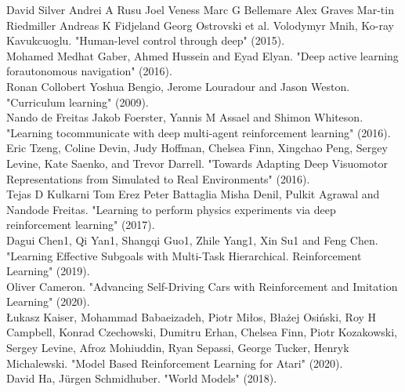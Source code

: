 \begin{thebibliography}{69}
 David Silver Andrei A Rusu Joel Veness Marc G Bellemare Alex Graves Mar-tin Riedmiller Andreas K Fidjeland Georg Ostrovski et al. Volodymyr Mnih, Ko-ray Kavukcuoglu. "Human-level control through deep" (2015).\\

 Mohamed Medhat Gaber, Ahmed Hussein and Eyad Elyan. "Deep active learning forautonomous navigation" (2016).\\

 Ronan Collobert Yoshua Bengio, Jerome Louradour and Jason Weston. "Curriculum learning" (2009).\\

 Nando de Freitas Jakob Foerster, Yannis M Assael and Shimon Whiteson. "Learning tocommunicate with deep multi-agent reinforcement learning" (2016).\\

 Eric Tzeng, Coline Devin, Judy Hoffman, Chelsea Finn, Xingchao Peng, Sergey Levine, Kate Saenko, and Trevor Darrell. "Towards Adapting Deep Visuomotor Representations from Simulated to Real Environments" (2016).\\

 Tejas D Kulkarni Tom Erez Peter Battaglia Misha Denil, Pulkit Agrawal and Nandode Freitas. "Learning to
perform physics experiments via deep reinforcement learning" (2017).\\

 Dagui Chen1, Qi Yan1, Shangqi Guo1, Zhile Yang1, Xin Su1 and Feng Chen. "Learning Effective Subgoals with Multi-Task Hierarchical. Reinforcement Learning" (2019).\\

 Oliver Cameron. "Advancing Self-Driving Cars with Reinforcement and Imitation Learning" (2020).\\

 Łukasz Kaiser, Mohammad Babaeizadeh, Piotr Miłos, Błażej Osiński, Roy H Campbell, Konrad Czechowski, Dumitru Erhan, Chelsea Finn, Piotr Kozakowski, Sergey Levine, Afroz Mohiuddin, Ryan Sepassi, George Tucker, Henryk Michalewski. "Model Based Reinforcement Learning for Atari" (2020).\\

 David Ha, Jürgen Schmidhuber. "World Models" (2018).\\


\end{thebibliography}
